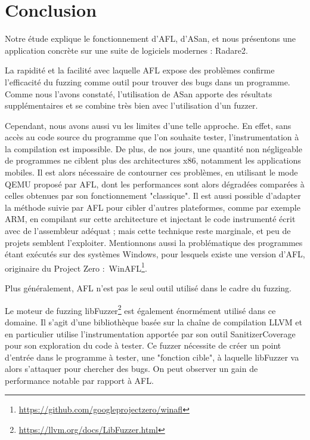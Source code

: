 \chapter*{Conclusion}

Notre étude explique le fonctionnement d'AFL, d'ASan, et nous présentons une
application concrète sur une suite de logiciels modernes : Radare2.

La rapidité et la facilité avec laquelle AFL expose des problèmes confirme
l'efficacité du fuzzing comme outil pour trouver des bugs dans un programme.
Comme nous l'avons constaté, l'utilisation de ASan apporte des résultats
supplémentaires et se combine très bien avec l'utilisation d'un fuzzer.

Cependant, nous avons aussi vu les limites d'une telle approche.
En effet, sans accès au code source du programme que l'on souhaite tester, l'instrumentation à la compilation est impossible.
De plus, de nos jours, une quantité non négligeable de programmes ne ciblent plus des architectures x86, notamment les applications mobiles.
Il est alors nécessaire de contourner ces problèmes, en utilisant le mode QEMU proposé par AFL, dont les performances sont alors dégradées comparées à celles obtenues par son fonctionnement "classique".
Il est aussi possible d'adapter la méthode suivie par AFL pour cibler d'autres plateformes, comme par exemple ARM, en compilant sur cette architecture et injectant le code instrumenté écrit avec de l'assembleur adéquat ; mais cette technique reste marginale, et peu de projets semblent l'exploiter.
Mentionnons aussi la problématique des programmes étant exécutés sur des systèmes Windows, pour lesquels existe une version d'AFL, originaire du Project Zero : WinAFL\footnote{\url{https://github.com/googleprojectzero/winafl}}.

Plus généralement, AFL n'est pas le seul outil utilisé dans le cadre du fuzzing.

Le moteur de fuzzing libFuzzer\footnote{\url{https://llvm.org/docs/LibFuzzer.html}}
est également énormément utilisé dans ce domaine.
Il s'agit d'une bibliothèque basée sur la chaîne de compilation LLVM et en
particulier utilise l'instrumentation apportée par son outil SanitizerCoverage
pour son exploration du code à tester.
Ce fuzzer nécessite de créer un point d'entrée dans le programme à tester, une
"fonction cible", à laquelle libFuzzer va alors s'attaquer pour chercher des bugs.
On peut observer un gain de performance notable par rapport à AFL.

